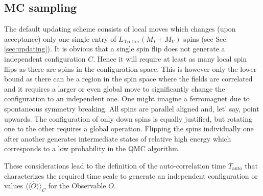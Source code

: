 


\subsection{MC sampling}\label{sec:sampling}
%
The default updating scheme consists of local moves which changes (upon acceptance) only one single entry of $L_{\mathrm{Trotter}}(M_I+M_V)$ spins (see Sec. \ref{sec:updating}). It is obvious that a single spin flip does not generate a independent configuration $C$. Hence it will require at least as many local spin flips as there are spins in the configuration space. This is however only the lower bound as there can be a region in the spin space where the fields are correlated and it requires a larger or even global move to significantly change the configuration to an independent one. One might imagine a ferromagnet due to spontaneous symmetry breaking. All spins are parallel aligned and, let' say, point upwards. The configuration of only down spins is equally justified, but rotating one to the other requires a global operation. Flipping the spins individually one after another generates intermediate states of relative high energy which corresponds to a low probability in the QMC algorithm.

These considerations lead to the definition of the auto-correlation time $T_\mathrm{auto}$ that characterizes the required time scale to generate an independent configuration or values $\langle\langle\hat{O}\rangle\rangle_C$ for the Observable $O$.

